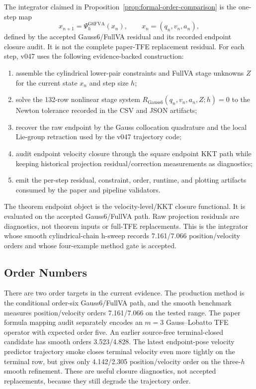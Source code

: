 \documentclass[11pt]{article}
\newcommand{\tfe}{TFE}
\begin{document}
The integrator claimed in Proposition~\ref{prop:formal-order-comparison} is the
one-step map
\begin{equation}
  x_{n+1}=\Psi_h^{\mathrm{G6FVA}}(x_n),
  \qquad x_n=(q_n,v_n,a_n),
\end{equation}
defined by the accepted Gauss6/FullVA residual and its recorded endpoint
closure audit.  It is not the complete paper-\tfe{} replacement residual.
For each step, v047 uses the following evidence-backed construction:
\begin{enumerate}
  \item assemble the cylindrical lower-pair constraints and FullVA stage
  unknowns $Z$ for the current state $x_n$ and step size $h$;
  \item solve the 132-row nonlinear stage system
  $R_{\mathrm{Gauss6}}(q_n,v_n,a_n,Z;h)=0$ to the Newton tolerance recorded in
  the CSV and JSON artifacts;
  \item recover the raw endpoint by the Gauss collocation quadrature and the
  local Lie-group retraction used by the v047 trajectory code;
  \item audit endpoint velocity closure through the square endpoint KKT path
  while keeping historical projection residual/correction measurements as
  diagnostics;
  \item emit the per-step residual, constraint, order, runtime, and plotting
  artifacts consumed by the paper and pipeline validators.
\end{enumerate}
The theorem endpoint object is the velocity-level/KKT closure functional.
It is evaluated on the accepted Gauss6/FullVA path.  Raw projection residuals
are diagnostics, not theorem inputs or full-\tfe{} replacements.  This is the
integrator whose smooth cylindrical-chain h-sweep records 7.161/7.066
position/velocity orders and whose four-example method gate is accepted.

\subsection{Order Numbers}

There are two order targets in the current evidence.  The production method is
the conditional order-six Gauss6/FullVA path, and the smooth benchmark measures
position/velocity orders 7.161/7.066 on the tested range.  The paper formula
mapping audit separately encodes an $m=3$ Gauss--Lobatto \tfe{} operator with
expected order five.  An earlier source-free terminal-closed candidate has
smooth orders 3.523/4.828.  The latest endpoint-pose velocity predictor
trajectory smoke closes terminal velocity even more tightly on the terminal
row, but gives only 4.142/2.305 position/velocity order on the three-$h$
smooth refinement.  These are useful closure diagnostics, not accepted
replacements, because they still degrade the trajectory order.
\end{document}
